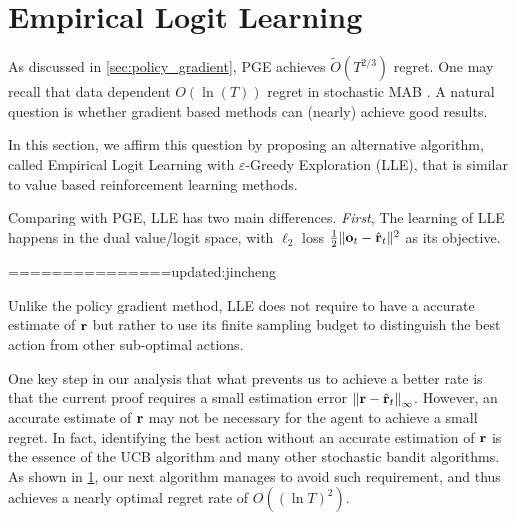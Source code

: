 \section{Empirical Logit Learning}
\label{sec:logit_learning}

As discussed in \cref{sec:policy_gradient}, PGE achieves $\tilde{O}(T^{2/3})$ regret. One may recall that data dependent $O(\ln(T))$ regret in stochastic MAB \citep{bubeck2012regret}. A natural question is whether gradient based methods can (nearly) achieve good results.

In this section, we affirm this question by proposing an alternative algorithm, called Empirical Logit Learning with $\varepsilon$-Greedy Exploration (LLE), that is similar to value based reinforcement learning methods.

Comparing with PGE, LLE has two main differences. \textit{First}, The learning of LLE happens in the dual value/logit space, with $\ell_2$ loss $\frac{1}{2} \| {\mathbf{o}}_t - \hat{{\mathbf{r}}}_t \|^2$ as its objective.

===============updated:jincheng

Unlike the policy gradient method, LLE does not require to have a accurate estimate of ${\mathbf{r}}$ but rather to use its finite sampling budget to distinguish the best action from other sub-optimal actions.



One key step in our analysis that what prevents us to achieve a better rate is that the current proof requires a small estimation error $\left\| {\mathbf{r}} - \hat{{\mathbf{r}}}_t \right\|_\infty$.
However, an accurate estimate of ${\mathbf{r}}$ may not be necessary for the agent to achieve a small regret. 
In fact, identifying the best action without an accurate estimation of ${\mathbf{r}}$ is the essence of the UCB algorithm and many other stochastic bandit algorithms. 
As shown in \cref{sec:logit_learning}, our next algorithm manages to avoid such requirement, and thus achieves a nearly optimal regret rate of $O((\ln T)^2)$.

